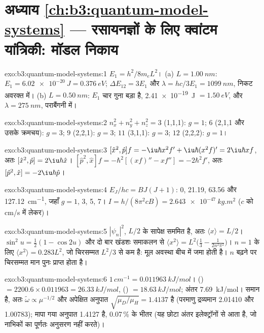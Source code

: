 \section*{अध्याय \ref{ch:b3:quantum-model-systems} --- रसायनज्ञों के लिए क्वांटम यांत्रिकी: मॉडल निकाय}

\begin{solution}{exo:b3:quantum-model-systems:1}
$E_1 = h^2/8m_eL^2$। (a) $L = \qty{1.00}{nm}$: $E_1 = \qty{6.02e-20}{J} =
\qty{0.376}{eV}$; $\Delta E_{12} = 3E_1$ और $\lambda = hc/3E_1 =
\qty{1099}{nm}$, निकट अवरक्त में। (b) $L = \qty{0.50}{nm}$: $E_1$ चार
गुना बड़ा है, \qty{2.41e-19}{J} $= \qty{1.50}{eV}$, और $\lambda =
\qty{275}{nm}$, पराबैंगनी में।
\end{solution}

\begin{solution}{exo:b3:quantum-model-systems:2}
$n_x^2 + n_y^2 + n_z^2 = 3$ (1,1,1): $g = 1$; $6$ (2,1,1 और उसके क्रमचय):
$g = 3$; $9$ (2,2,1): $g = 3$; $11$ (3,1,1): $g = 3$; $12$ (2,2,2): $g = 1$।
\end{solution}

\begin{solution}{exo:b3:quantum-model-systems:3}
$[\hat x^2,\hat p]f = -\iu\hbar x^2f' + \iu\hbar(x^2f)' = 2\iu\hbar xf$, अतः
$[\hat x^2,\hat p] = 2\iu\hbar\hat x$। $[\hat p^2,\hat x]f = -\hbar^2[(xf)'' -
xf''] = -2\hbar^2f'$, अतः $[\hat p^2,\hat x] = -2\iu\hbar\hat p$।
\end{solution}

\begin{solution}{exo:b3:quantum-model-systems:4}
$E_J/hc = BJ(J+1)$: 0, 21.19, 63.56 और \qty{127.12}{cm^{-1}}, जहाँ $g = 1$,
3, 5, 7। $I = h/(8\pi^2cB) = \qty{2.643e-47}{kg.m^2}$ ($c$ को
\unit{cm/s} में लेकर)।
\end{solution}

\begin{solution}{exo:b3:quantum-model-systems:5}
$|\psi_n|^2$, $L/2$ के सापेक्ष सममित है, अतः $\langle x\rangle = L/2$।
$\sin^2u = \frac12(1 - \cos2u)$ और दो बार खंडशः समाकलन से
$\langle x^2\rangle = L^2\big(\frac13 - \frac{1}{2n^2\pi^2}\big)$। $n = 1$ के लिए
$\langle x^2\rangle = 0.283L^2$, जो चिरसम्मत $L^2/3$ से कम है: मूल
अवस्था बीच में जमा होती है। $n$ बढ़ने पर चिरसम्मत मान पुनः प्राप्त होता है।
\end{solution}

\begin{solution}{exo:b3:quantum-model-systems:6}
$1\,\unit{cm^{-1}} = \qty{0.011963}{kJ/mol}$। () $= 2200.6 \times
0.011963 = \qty{26.33}{kJ/mol}$, () $= \qty{18.63}{kJ/mol}$; अंतर
\qty{7.69}{kJ/mol}।  समान है, अतः $\tilde\omega \propto \mu^{-1/2}$
और अपेक्षित अनुपात $\sqrt{\mu_D/\mu_H} = 1.4137$ है (परमाणु द्रव्यमान
2.01410 और 1.00783); मापा गया अनुपात 1.4127 है, 0.07\,\% के भीतर (यह
छोटा अंतर इलेक्ट्रॉनों से आता है, जो नाभिकों का पूर्णतः
अनुसरण नहीं करते)।
\end{solution}

